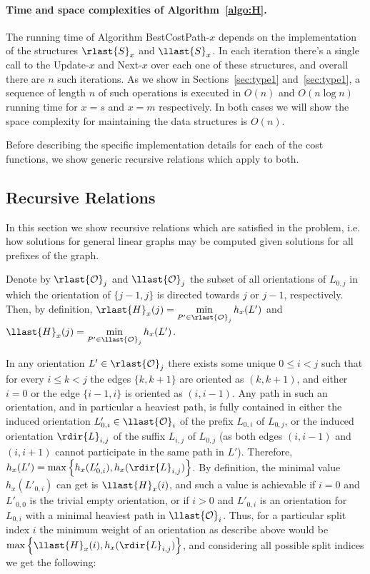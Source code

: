 \paragraph{Time and space complexities of Algorithm~\ref{algo:H}.}
The running time of Algorithm BestCostPath-$x$ depends on the implementation of the structures $\rlast{S}_x$ and $\llast{S}_x$. In each iteration there's a single call to the Update-$x$ and Next-$x$ over each one of these structures, and overall there are $n$ such iterations. As we show in Sections~\ref{sec:type1} and~\ref{sec:type1}, a sequence of length $n$ of such operations is executed in $O(n)$ and $O(n \log n)$ running time for $x = s$ and $x = m$ respectively. In both cases we will show the space complexity for maintaining the data structures is $O(n)$.

Before describing the specific implementation details for each of the cost functions, we show generic recursive relations which apply to both.

\subsection{Recursive Relations}

In this section we show recursive relations which are satisfied in the problem, i.e. how solutions for general linear graphs may be computed given solutions for all prefixes of the graph. 

Denote by $\rlast{\mathcal{O}}_j$ and $\llast{\mathcal{O}}_j$ the subset of all orientations of $L_{0, j}$ in which the orientation of $\{j-1, j\}$ is directed towards $j$ or $j-1$, respectively. Then, by definition, $\rlast{H}_x(j) = \min\limits_{P' \in \rlast{\mathcal{O}}_j} h_x(L')$ and $\llast{H}_x(j) = \min\limits_{P' \in \llast{\mathcal{O}}_j} h_x(L')$. 

In any orientation $L' \in \rlast{\mathcal{O}}_j$ there exists some unique $0 \leq i < j$ such that for every $i \leq k < j$ the edges $\{k, k+1\}$ are oriented as $(k, k+1)$, and either $i = 0$ or the edge $\{i-1, i\}$ is oriented as $(i, i-1)$. Any path in such an orientation, and in particular a heaviest path, is fully contained in either the induced orientation $L'_{0, i} \in \llast{\mathcal{O}}_i$ of the prefix $L_{0, i}$ of $L_{0, j}$, or the induced orientation $\rdir{L}_{i, j}$ of the suffix $L_{i, j}$ of $L_{0, j}$ (as both edges $(i, i-1)$ and $(i, i+1)$ cannot participate in the same path in $L'$). Therefore, $h_x(L') = \max \left\{h_x(L'_{0, i}), h_x(\rdir{L}_{i, j})\right\}$. By definition, the minimal value $h_x(L'_{0, i})$ can get is $\llast{H}_x(i)$, and such a value is achievable if $i = 0$ and $L'_{0, 0}$ is the trivial empty orientation, or if $i > 0$ and $L'_{0, i}$ is an orientation for $L_{0, i}$ with a minimal heaviest path in $\llast{\mathcal{O}}_i$. Thus, for a particular split index $i$ the minimum weight of an orientation as describe above would be $\max\left\{\llast{H}_x(i), h_x(\rdir{L}_{i, j})\right\}$, and considering all possible split indices we get the following:

